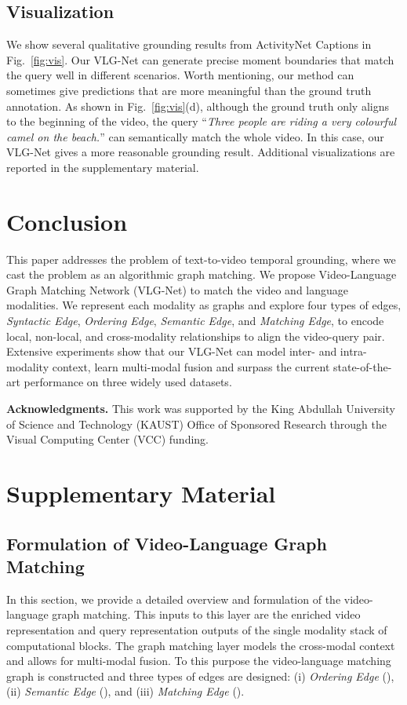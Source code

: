 \documentclass[10pt,twocolumn,letterpaper]{article}
\begin{document}
\subsection{Visualization} \label{subsec: qualitative}
We show several qualitative grounding results from ActivityNet Captions in Fig.~\ref{fig:vis}. Our VLG-Net can generate precise moment boundaries that match the query well in different scenarios. Worth mentioning, our method can sometimes give predictions that are more meaningful than the ground truth annotation. As shown in Fig.~\ref{fig:vis}(d), although the ground truth only aligns to the beginning of the video, the query ``\textit{Three people are riding a very colourful camel on the beach.}'' can semantically match the whole video. In this case, our VLG-Net gives a more reasonable grounding result. Additional visualizations are reported in the supplementary material. 



 \section{Conclusion}\label{sec: conclusions}
This paper addresses the problem of text-to-video temporal grounding, where we cast the problem as an algorithmic graph matching.
We propose Video-Language Graph Matching Network (VLG-Net) to match the video and language modalities. We represent each modality as graphs and explore four types of edges, \textit{Syntactic Edge}, \textit{Ordering Edge}, \textit{Semantic Edge}, and \textit{Matching Edge}, to encode local, non-local, and cross-modality relationships to align the video-query pair. Extensive experiments show that our VLG-Net can model inter- and intra-modality context, learn multi-modal fusion and surpass the current state-of-the-art performance on three widely used datasets. 

\noindent\textbf{Acknowledgments.} This work was supported by the King Abdullah University of Science and Technology (KAUST) Office of Sponsored Research through the Visual Computing Center (VCC) funding. 
{\small


}

\newpage
\section*{Supplementary Material}
\subsection*{Formulation of Video-Language Graph Matching}
In this section, we provide a detailed overview and formulation of the video-language graph matching. 
This inputs to this layer are the enriched video representation  and query representation  outputs of the single modality stack of computational blocks. The graph matching layer models the cross-modal context and allows for multi-modal fusion. To this purpose the video-language matching graph is constructed and three types of edges are designed: (i) \textit{Ordering Edge} (), (ii) \textit{Semantic Edge} (), and (iii) \textit{Matching Edge }().
\end{document}
